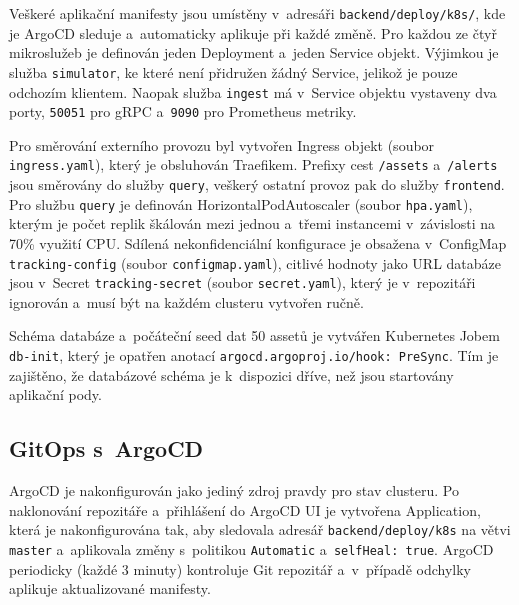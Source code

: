 \documentclass[11pt, a4paper, oneside]{article}
\begin{document}
Veškeré aplikační manifesty jsou umístěny v~adresáři \texttt{backend/deploy/k8s/}, kde je ArgoCD sleduje a~automaticky aplikuje při každé změně. Pro každou ze čtyř mikroslužeb je definován jeden Deployment a~jeden Service objekt. Výjimkou je služba \texttt{simulator}, ke které není přidružen žádný Service, jelikož je pouze odchozím klientem. Naopak služba \texttt{ingest} má v~Service objektu vystaveny dva porty, \texttt{50051} pro gRPC a~\texttt{9090} pro Prometheus metriky.

Pro směrování externího provozu byl vytvořen Ingress objekt (soubor \texttt{ingress.yaml}), který je obsluhován Traefikem. Prefixy cest \texttt{/assets} a~\texttt{/alerts} jsou směrovány do služby \texttt{query}, veškerý ostatní provoz pak do služby \texttt{frontend}. Pro službu \texttt{query} je definován HorizontalPodAutoscaler (soubor \texttt{hpa.yaml}), kterým je počet replik škálován mezi jednou a~třemi instancemi v~závislosti na 70\% využití CPU. Sdílená nekonfidenciální konfigurace je obsažena v~ConfigMap \texttt{tracking-config} (soubor \texttt{configmap.yaml}), citlivé hodnoty jako URL databáze jsou v~Secret \texttt{tracking-secret} (soubor \texttt{secret.yaml}), který je v~repozitáři ignorován a~musí být na každém clusteru vytvořen ručně.

Schéma databáze a~počáteční seed dat 50 assetů je vytvářen Kubernetes Jobem \texttt{db-init}, který je opatřen anotací \texttt{argocd.argoproj.io/hook: PreSync}. Tím je zajištěno, že databázové schéma je k~dispozici dříve, než jsou startovány aplikační pody.

\subsection{GitOps s~ArgoCD}

ArgoCD je nakonfigurován jako jediný zdroj pravdy pro stav clusteru. Po naklonování repozitáře a~přihlášení do ArgoCD UI je vytvořena Application, která je nakonfigurována tak, aby sledovala adresář \texttt{backend/deploy/k8s} na větvi \texttt{master} a~aplikovala změny s~politikou \texttt{Automatic} a~\texttt{selfHeal: true}. ArgoCD periodicky (každé 3 minuty) kontroluje Git repozitář a~v~případě odchylky aplikuje aktualizované manifesty.
\end{document}
